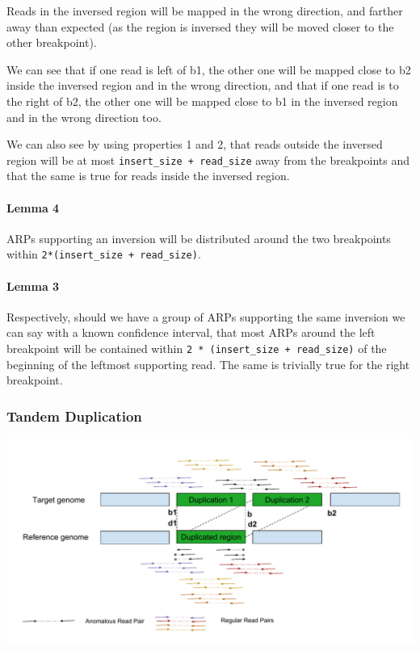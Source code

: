 \documentclass{article}
\begin{document}
Reads in the inversed region will be mapped in the wrong direction, and farther away
than expected (as the region is inversed they will be moved closer to the other breakpoint).

We can see that if one read is left of b1, the other one will be mapped close to
b2 inside the inversed region and in the wrong direction, and that if one read is to the right
of b2, the other one will be mapped close to b1 in the inversed region and in the wrong direction
too.

We can also see by using properties 1 and 2, that reads outside the inversed region will be at most
\verb|insert_size + read_size| away from the breakpoints and that the same is true for reads inside
the inversed region.

\paragraph{Lemma 4} ARPs supporting an inversion will be distributed around the two
breakpoints within \verb|2*(insert_size + read_size)|.

\paragraph{Lemma 3} Respectively, should we have a group of ARPs supporting the same inversion we can say with a known confidence interval, that most ARPs around the left breakpoint will be contained within \verb|2 * (insert_size + read_size)| of the beginning of the leftmost supporting read. The same is trivially true for the right breakpoint.

\subsubsection{Tandem Duplication}

\includegraphics[width=\textwidth]{DuplicationReadPairs}
\end{document}
